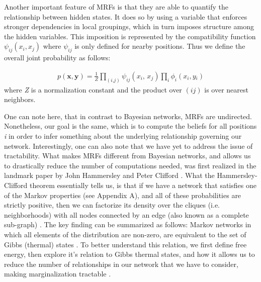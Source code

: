 \documentclass{article}
\begin{document}
Another important feature of MRFs is that they are able to quantify the relationship between hidden states. It does so by using a variable that enforces stronger dependencies in local groupings, which in turn imposes structure among the hidden variables. This imposition is represented by the compatibility function $\psi_{ij}\left(\textit{x}_i, \textit{x}_j \right)$ where $\psi_{ij}$ is only defined for nearby positions. Thus we define the overall joint probability as follows:

\begin{equation} \label{MRF_pdf}
    \begin{aligned}
        \textit{p}\left(\textbf{x}, \textbf{y}\right) = \frac{1}{\textit{Z}}\prod_{\left(\textit{{i,j}}\right)}\textit{$\psi_{ij}$}\left(\textit{x$_i$, x$_j$}\right)\prod_{\textit{i}}\textit{$\phi_i$}\left(\textit{x$_i$},\textit{y$_i$}\right)
    \end{aligned}
\end{equation} where \textit{Z} is a normalization constant and the product over \textit{$\left(ij\right)$} is over nearest neighbors. 

One can note here, that in contrast to Bayesian networks, MRFs are undirected. Nonetheless, our goal is the same, which is to compute the beliefs for all positions \textit{i} in order to infer something about the underlying relationship governing our network. Interestingly, one can also note that we have yet to address the issue of tractability. What makes MRFs different from Bayesian networks, and allows us to drastically reduce the number of computations needed, was first realized in the landmark paper by John Hammersley and Peter Clifford \cite{JMH_markovFieldsOnFiniteGraphs}. What the Hammersley-Clifford theorem essentially tells us, is that if we have a network that satisfies one of the Markov properties (see Appendix A), and all of these probabilities are strictly positive, then we can factorize its density over the cliques (i.e. neighborhoods) with all nodes connected by an edge (also known as a complete sub-graph) \cite{JDL_conditionalRandFieldsProbModsForSegmenting}. The key finding can be summarized as follows: Markov networks in which all elements of the distribution are non-zero, are equivalent to the set of Gibbs (thermal) states \cite{KK_quantumApproxMarkov}. To better understand this relation, we first define free energy, then explore it's relation to Gibbs thermal states, and how it allows us to reduce the number of relationships in our network that we have to consider, making marginalization tractable \cite{JSY_understandBeliefPropAndGeneral}. 
\end{document}
